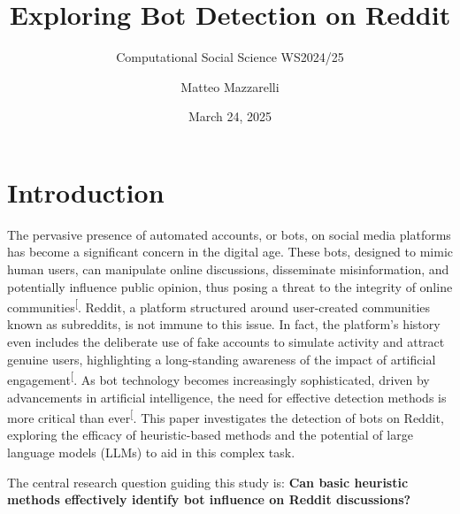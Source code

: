 \documentclass[
  12pt,
  letterpaper,
  DIV=11,
  numbers=noendperiod]{scrartcl}
\title{Exploring Bot Detection on Reddit}
\subtitle{Computational Social Science WS2024/25}
\author{Matteo Mazzarelli}
\date{March 24, 2025}
\renewcommand*\contentsname{Table of contents}
\newcommand\contentsname{Table of contents}
\begin{document}
\maketitle

\renewcommand*\contentsname{Table of contents}
{
\hypersetup{linkcolor=}
\setcounter{tocdepth}{3}
\tableofcontents
}

\newpage

\section{Introduction}\label{introduction}

The pervasive presence of automated accounts, or bots, on social media
platforms has become a significant concern in the digital age. These
bots, designed to mimic human users, can manipulate online discussions,
disseminate misinformation, and potentially influence public opinion,
thus posing a threat to the integrity of online
communities\textsuperscript{{[}\citeproc{ref-botdetectionreddit}{1}{]}}.
Reddit, a platform structured around user-created communities known as
subreddits, is not immune to this issue. In fact, the platform's history
even includes the deliberate use of fake accounts to simulate activity
and attract genuine users, highlighting a long-standing awareness of the
impact of artificial
engagement\textsuperscript{{[}\citeproc{ref-redditbotproblem}{2}{]}}. As
bot technology becomes increasingly sophisticated, driven by
advancements in artificial intelligence, the need for effective
detection methods is more critical than
ever\textsuperscript{{[}\citeproc{ref-botdetectionreddit}{1}{]}}. This
paper investigates the detection of bots on Reddit, exploring the
efficacy of heuristic-based methods and the potential of large language
models (LLMs) to aid in this complex task.

The central research question guiding this study is: \textbf{Can basic
heuristic methods effectively identify bot influence on Reddit
discussions?}
\end{document}
